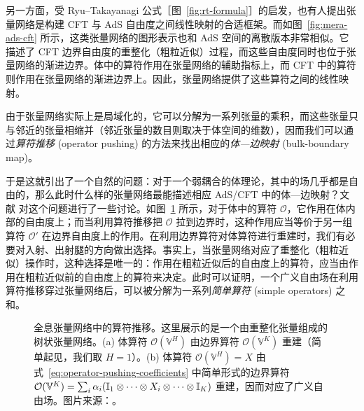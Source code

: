另一方面，受 Ryu--Takayanagi 公式\cite{ryu2006holographic,nishioka2009holographic}［图~\ref{fig:rt-formula}］的启发，也有人提出张量网络是构建 CFT 与 AdS 自由度之间线性映射的合适框架\cite{swingle2012entanglement}。而如图~\ref{fig:mera-ads-cft} 所示，这类张量网络的图形表示也和 AdS 空间的离散版本非常相似。它描述了 CFT 边界自由度的重整化（粗粒近似）过程，而这些自由度同时也位于张量网络的渐进边界。体中的算符作用在张量网络的辅助指标上，而 CFT 中的算符则作用在张量网络的渐进边界上。因此，张量网络提供了这些算符之间的线性映射\cite{pastawski2015holographic,hayden2016holographic}。

由于张量网络实际上是局域化的，它可以分解为一系列张量的乘积，而这些张量只与邻近的张量相缩并（邻近张量的数目则取决于体空间的维数），因而我们可以通过\emph{算符推移} (operator pushing) 的方法来找出相应的\emph{体—边映射} (bulk-boundary map)\cite{pastawski2015holographic,bhattacharyya2016exploring,bhattacharyya2018tensor}。

于是这就引出了一个自然的问题：对于一个弱耦合的体理论，其中的场几乎都是自由的，那么此时什么样的张量网络最能描述相应 AdS/CFT 中的体—边映射？文献 \parencite{bhattacharyya2018tensor} 对这个问题进行了一些讨论。如图~\ref{fig:operator-pushing} 所示，对于体中的算符 $\mathcal{O}$，它作用在体内部的自由度上；而当利用算符推移把 $\mathcal{O}$ 拉到边界时，这种作用应当等价于另一组算符 $\mathcal{O}'$ 在边界自由度上的作用。在利用边界算符对体算符进行重建时，我们有必要对入射、出射腿的方向做出选择。事实上，当张量网络对应了重整化（粗粒近似）操作时，这种选择是唯一的：作用在粗粒近似后的自由度上的算符，应当由作用在粗粒近似前的自由度上的算符来决定。此时可以证明，一个广义自由场在利用算符推移穿过张量网络后，可以被分解为一系列\emph{简单算符} (simple operators) 之和\cite{bhattacharyya2018tensor}。

\begin{figure}[htb]
  \centering
  \caption[全息张量网络中的算符推移]{全息张量网络中的算符推移。这里展示的是一个由重整化张量组成的树状张量网络。(a) 体算符 $\mathcal{O}(\mathbb{V}^H)$ 由边界算符 $\mathcal{O}(\mathbb{V}^K)$ 重建（简单起见，我们取 $H=1$）。(b) 体算符 $\mathcal{O}(\mathbb{V}^H)=X$ 由式~\eqref{eq:operator-pushing-coefficients} 中简单形式的边界算符 $\mathcal{O}(\mathbb{V}^K)=\sum_i\alpha_i(\mathbb{I}_1\otimes\cdots\otimes X_i\otimes\dots\otimes\mathbb{I}_{K})$ 重建，因而对应了广义自由场。图片来源：\parencite{zeng2023bulk}。}
  \label{fig:operator-pushing}
\end{figure}

